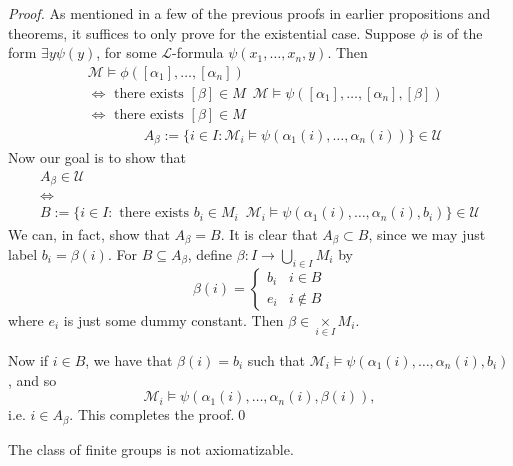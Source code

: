 \documentclass[notoc,notitlepage]{tufte-book}
\begin{document}
\begin{proof}
    \noindent
     As mentioned in a few of the previous proofs in earlier propositions and theorems, it suffices to only prove for the existential case. Suppose $\phi$ is of the form $\exists y \psi(y)$, for some $\mathcal{L}$-formula $\psi(x_1, \ldots, x_n, y)$. Then
    \begin{align*}
      &\mathcal{M} \models \phi([\alpha_1], \ldots, [\alpha_n]) \\
      &\iff \text{ there exists } [ \beta ] \in M \enspace \mathcal{M} \models \psi([\alpha_1], \ldots, [\alpha_n], [\beta]) \\
      &\iff \text{ there exists } [\beta] \in M \enspace \\
      &\qquad\qquad A_\beta := \{ i \in I : \mathcal{M}_i \models \psi(\alpha_1(i), \ldots, \alpha_n(i)) \} \in \mathcal{U}
    \end{align*}
    Now our goal is to show that
    \begin{gather*}
      A_\beta \in \mathcal{U} \\
      \iff \\
      B := \{ i \in I : \text{ there exists } b_i \in M_i \enspace \mathcal{M}_i \models \psi(\alpha_1(i), \ldots, \alpha_n(i), b_i) \} \in \mathcal{U}
    \end{gather*}
    We can, in fact, show that $A_\beta = B$. It is clear that $A_\beta \subset B$, since we may just label $b_i = \beta(i)$. For $B \subseteq A_\beta$, define $\beta : I \to \bigcup_{i \in I} M_i$ by
    \begin{equation*}
      \beta(i) = \begin{cases}
        b_i & i \in B \\
        e_i & i \notin B
      \end{cases}
    \end{equation*}
    where $e_i$ is just some dummy constant. Then $\beta \in \underset{i \in I}{\times} M_i$.
    
    Now if $i \in B$, we have that $\beta(i) = b_i$ such that $\mathcal{M}_i \models \psi(\alpha_1(i), \ldots, \alpha_n(i), b_i)$, and so
    \begin{equation*}
      \mathcal{M}_i \models \psi(\alpha_1(i), \ldots, \alpha_n(i), \beta(i)),
    \end{equation*}
    i.e. $i \in A_\beta$. This completes the proof.\qed\
\end{proof}

\begin{eg}
  The class of finite groups is not axiomatizable.
\end{eg}
\end{document}
